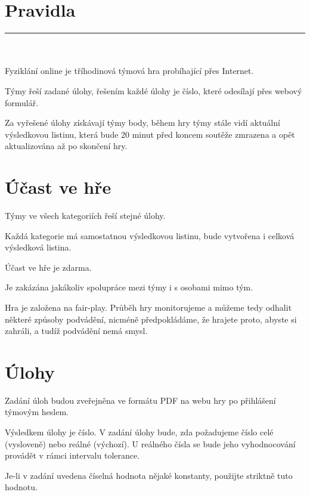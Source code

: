 \documentclass[a4paper,11pt,oneside]{article}
\begin{document}
\section*{Pravidla}
\hrule
\hfill
\\
\\
Fyziklání online je tříhodinová týmová hra probíhající přes Internet.

Týmy řeší zadané úlohy, řešením každé úlohy je číslo, které odesílají přes 
webový formulář.

Za vyřešené úlohy získávají týmy body, během hry týmy stále vidí aktuální 
výsledkovou listinu, která bude 20 minut před koncem soutěže zmrazena a opět 
aktualizována až po skončení hry.

\section{Účast ve hře}

Týmy ve všech kategoriích řeší stejné úlohy. 

Každá kategorie má samostatnou výsledkovou listinu, bude vytvořena i celková výsledková listina.

Účast ve hře je zdarma.

Je zakázána jakákoliv spolupráce mezi týmy i s osobami mimo tým.

Hra je založena na fair-play. Průběh hry monitorujeme a můžeme tedy odhalit 
některé způsoby podvádění, nicméně předpokládáme, že hrajete proto, abyste si 
zahráli, a tudíž podvádění nemá smysl.

\section{Úlohy}

Zadání úloh budou zveřejněna ve formátu PDF na webu hry po přihlášení 
týmovým heslem.

Výsledkem úlohy je číslo. V zadání úlohy bude, zda požadujeme číslo celé 
(vysloveně) nebo reálné (výchozí). U reálného čísla se bude jeho vyhodnocování 
provádět v rámci intervalu tolerance.

Je-li v zadání uvedena číselná hodnota nějaké konstanty, použijte striktně 
tuto hodnotu.
\end{document}
